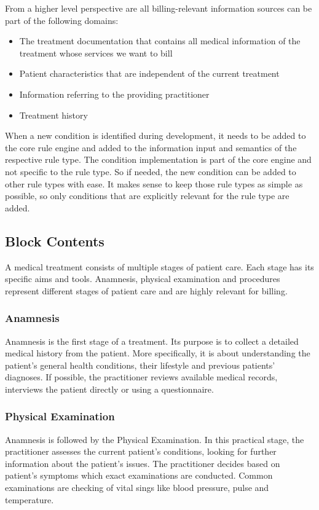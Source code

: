 From a higher level perspective are all billing-relevant information sources can be part of the following domains:
\begin{itemize}
    \item The treatment documentation that contains all medical information of the treatment whose services we want to bill
    \item Patient characteristics that are independent of the current treatment
    \item Information referring to the providing practitioner
    \item Treatment history
\end{itemize}
When a new condition is identified during development,
it needs to be added to the core rule engine
and added to the information input and semantics of the respective rule type.
The condition implementation is part of the core engine and not specific to the rule type.
So if needed, the new condition can be added to other rule types with ease.
It makes sense to keep those rule types as simple as possible,
so only conditions that are explicitly relevant for the rule type are added.

\subsection{Block Contents}
A medical treatment consists of multiple stages of patient care.
Each stage has its specific aims and tools.
Anamnesis,
physical examination and procedures represent different stages of patient care and are highly relevant for billing.

\subsubsection{Anamnesis}
Anamnesis is the first stage of a treatment.
Its purpose is to collect a detailed medical history from the patient\cite{lino2021medical}.
More specifically, it is about understanding the patient's general health conditions,
their lifestyle and previous patients' diagnoses.
If possible, the practitioner reviews available medical records,
interviews the patient directly or using a questionnaire\cite{zhang2011anamnevis}.

\subsubsection{Physical Examination}
Anamnesis is followed by the Physical Examination.
In this practical stage, the practitioner assesses the current patient's conditions,
looking for further information about the patient's issues\cite{seidel2010mosby}.
The practitioner decides based on patient's symptoms which exact examinations are conducted.
Common examinations are checking of vital sings like blood pressure, pulse and temperature.

